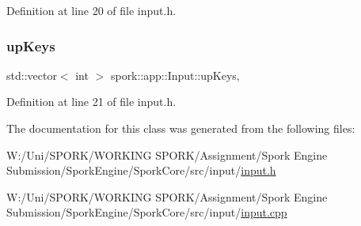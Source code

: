 Definition at line 20 of file input.\+h.

\mbox{\label{classspork_1_1app_1_1_input_a7820f843c7008add303c10b3c8e28423}} 
\subsubsection{\texorpdfstring{up\+Keys}{upKeys}}
{\footnotesize\ttfamily std\+::vector$<$ int $>$ spork\+::app\+::\+Input\+::up\+Keys\hspace{0.3cm}{\ttfamily [static]}, {\ttfamily [private]}}



Definition at line 21 of file input.\+h.



The documentation for this class was generated from the following files\+:\begin{DoxyCompactItemize}
\item 
W\+:/\+Uni/\+S\+P\+O\+R\+K/\+W\+O\+R\+K\+I\+N\+G S\+P\+O\+R\+K/\+Assignment/\+Spork Engine Submission/\+Spork\+Engine/\+Spork\+Core/src/input/\hyperlink{input_8h}{input.\+h}\item 
W\+:/\+Uni/\+S\+P\+O\+R\+K/\+W\+O\+R\+K\+I\+N\+G S\+P\+O\+R\+K/\+Assignment/\+Spork Engine Submission/\+Spork\+Engine/\+Spork\+Core/src/input/\hyperlink{input_8cpp}{input.\+cpp}\end{DoxyCompactItemize}
